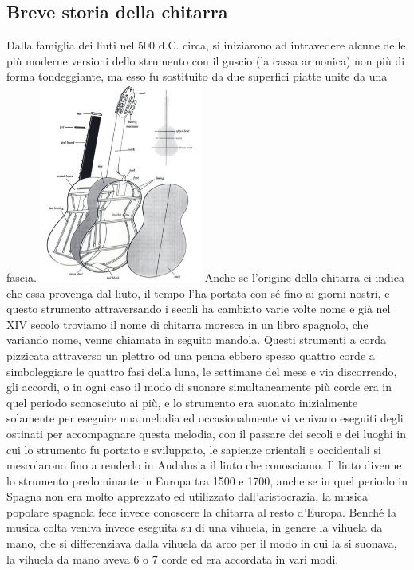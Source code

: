 \documentclass[oneside]{article}
\begin{document}
\begin{multicols*}{2}

\section{ Breve storia della chitarra}

Dalla famiglia dei liuti nel 500 d.C. circa, si iniziarono ad intravedere alcune delle più moderne versioni dello strumento con il guscio (la cassa armonica) non più di forma tondeggiante, ma esso fu sostituito da due superfici piatte unite da una fascia.
\includegraphics[width=0.4\textwidth]{img/chit_spaccato.png}
Anche se l’origine della chitarra ci indica che essa provenga dal liuto, il tempo l’ha portata con sé fino ai giorni nostri, e questo strumento attraversando i secoli ha cambiato varie volte nome e già nel XIV secolo troviamo il nome di chitarra moresca in un libro spagnolo, che variando nome, venne chiamata in seguito mandola.
Questi strumenti a corda pizzicata attraverso un plettro od una penna ebbero spesso quattro corde a simboleggiare le quattro fasi della luna, le settimane del mese e via discorrendo, gli accordi, o in ogni caso il modo di suonare simultaneamente più corde era in quel periodo sconosciuto ai più, e lo strumento era suonato inizialmente solamente per eseguire una melodia ed occasionalmente vi venivano eseguiti degli ostinati per accompagnare questa melodia, con il passare dei secoli e dei luoghi in cui lo strumento fu portato e sviluppato, le sapienze orientali e occidentali si mescolarono fino a renderlo in Andalusia il liuto che conosciamo.
Il liuto divenne lo strumento predominante in Europa tra 1500 e 1700, anche se in quel periodo in Spagna non era molto apprezzato ed utilizzato dall’aristocrazia, la musica popolare spagnola fece invece conoscere la chitarra al resto d’Europa. Benché la musica colta veniva invece eseguita su di una vihuela, in genere la vihuela da mano, che si differenziava dalla vihuela da arco per il modo in cui la si suonava, la vihuela da mano aveva 6 o 7 corde ed era accordata in vari modi.

\end{multicols*}
\end{document}
